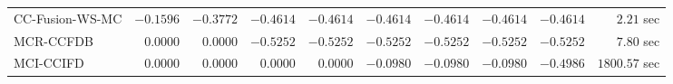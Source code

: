 \begin{table}[H]
\begin{tabular}{lrrrrrrrrr}
     CC-Fusion-WS-MC & $      -0.1596$ & $      -0.3772$ & $      -0.4614$ & $      -0.4614$ & $      -0.4614$ & $      -0.4614$ & $      -0.4614$ & $      -0.4614$ & $         2.21$ sec   \\ 
\cmidrule{1-1} 
           MCR-CCFDB & $       0.0000$ & $       0.0000$ & $      -0.5252$ & $      -0.5252$ & $      -0.5252$ & $      -0.5252$ & $      -0.5252$ & $      -0.5252$ & $         7.80$ sec   \\ 
\cmidrule{1-1} 
           MCI-CCIFD & $       0.0000$ & $       0.0000$ & $       0.0000$ & $       0.0000$ & $      -0.0980$ & $      -0.0980$ & $      -0.0980$ & $      -0.4986$ & $      1800.57$ sec   \\ 
\bottomrule
\end{tabular}
\end{table}

